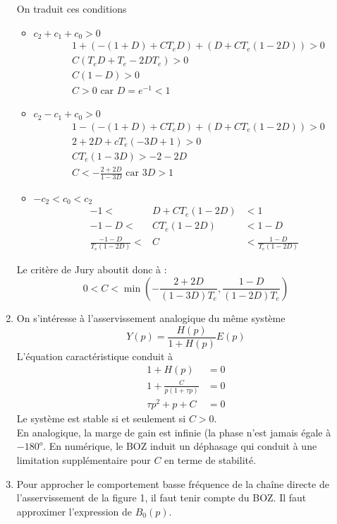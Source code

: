 \documentclass[../main.tex]{subfiles}
\begin{document}
\begin{enumerate}
On traduit ces conditions
\begin{itemize}
\item $c_2 + c_1 + c_0 > 0$
\begin{align*}
& 1 + (-(1+D) + CT_eD) + (D + CT_e(1-2D)) > 0 \\
& C ( T_e D + T_e - 2 DT_e ) > 0 \\
& C (1-D) > 0 \\
& C > 0 \text{ car } D =e^{-1} < 1
\end{align*}

\item $c_2 - c_1 + c_0 > 0$
\begin{align*}
& 1 - (-(1+D) + CT_eD) + (D + CT_e(1-2D)) > 0 \\
& 2 + 2D + cT_e(-3D+1) > 0 \\
& C T_e(1-3D) > -2 -2D  \\
& C < -\frac{2+2D}{1-3D} \text{  car } 3D > 1
\end{align*}

\item $-c_2 < c_0 < c_2$
\begin{eqnarray*}
-1 < & D + CT_e(1-2D) & < 1 \\
-1 - D < & CT_e(1-2D) & < 1 - D \\
\frac{-1-D}{T_e(1-2D)} < & C & < \frac{1-D}{T_e(1-2D)}
\end{eqnarray*}
\end{itemize}

Le critère de Jury aboutit donc à :
\[ \boxed{ 0 < C < \min(-\frac{2+2D}{(1-3D)T_e},\frac{1-D}{(1-2D)T_e}) } \]

\item On s'intéresse à l'asservissement analogique du même système
\[ Y(p) = \frac{H(p)}{1+H(p)} E(p) \]
L'équation caractéristique conduit à
\begin{align*}
1 + H(p) & = 0 \\
1 + \frac{C}{p(1+\tau p)} &= 0 \\
\tau p^2 + p + C &= 0
\end{align*}
Le système est stable si et seulement si $C>0$.\\
En analogique, la marge de gain est infinie (la phase n'est jamais égale à $-180^o$. En numérique, le BOZ induit un déphasage qui conduit à une limitation supplémentaire pour $C$ en terme de stabilité.


\item Pour approcher le comportement basse fréquence de la chaîne directe de l'asservissement de la figure 1, il faut tenir compte du BOZ. Il faut approximer l'expression de $B_0(p)$.


\end{enumerate}
\end{document}
